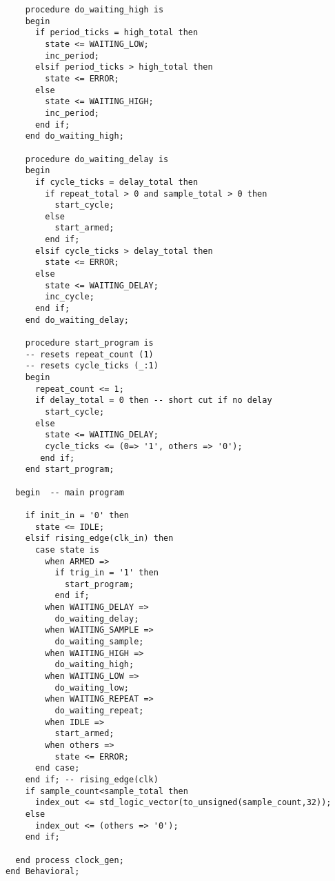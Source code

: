 \documentclass{article}
\begin{document}
\begin{lstlisting}
    procedure do_waiting_high is
    begin
      if period_ticks = high_total then
        state <= WAITING_LOW;
        inc_period;
      elsif period_ticks > high_total then
        state <= ERROR;
      else
        state <= WAITING_HIGH;
        inc_period;
      end if;
    end do_waiting_high;

    procedure do_waiting_delay is
    begin
      if cycle_ticks = delay_total then
        if repeat_total > 0 and sample_total > 0 then
          start_cycle;
        else
          start_armed;
        end if;
      elsif cycle_ticks > delay_total then
        state <= ERROR;
      else
        state <= WAITING_DELAY;
        inc_cycle;
      end if;
    end do_waiting_delay;

    procedure start_program is
    -- resets repeat_count (1)
    -- resets cycle_ticks (_:1)
    begin
      repeat_count <= 1;
      if delay_total = 0 then -- short cut if no delay
        start_cycle;
      else
        state <= WAITING_DELAY;
        cycle_ticks <= (0=> '1', others => '0');
       end if;
    end start_program;

  begin  -- main program

    if init_in = '0' then
      state <= IDLE;
    elsif rising_edge(clk_in) then
      case state is
        when ARMED => 
          if trig_in = '1' then
            start_program;
          end if;
        when WAITING_DELAY =>
          do_waiting_delay;
        when WAITING_SAMPLE =>
          do_waiting_sample;
        when WAITING_HIGH =>
          do_waiting_high;
        when WAITING_LOW =>
          do_waiting_low;
        when WAITING_REPEAT =>
          do_waiting_repeat;
        when IDLE =>
          start_armed;
        when others =>
          state <= ERROR;
      end case;
    end if; -- rising_edge(clk)
    if sample_count<sample_total then
      index_out <= std_logic_vector(to_unsigned(sample_count,32));
    else
      index_out <= (others => '0');
    end if;

  end process clock_gen;
end Behavioral;

\end{lstlisting}
\clearpage\thispagestyle{empty}
\end{document}
